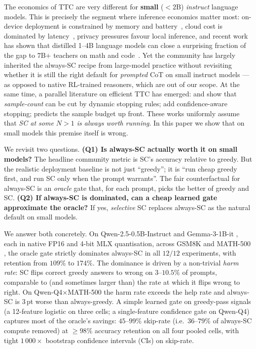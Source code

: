 \documentclass[11pt]{article}
\begin{document}
The economics of TTC are very different for \textbf{small} ($<2$B)
\emph{instruct} language models. This is precisely the segment
where inference economics matter most: on-device deployment is
constrained by memory and battery~\citep{Wang2025MNNLLM,
Bsharat2025MobileMMLU}, cloud cost is dominated by
latency~\citep{Cao2026PER}, privacy pressures favour local
inference, and recent work has shown that distilled
1--4B language models can close a surprising fraction of the gap to
$7$B$+$ teachers on math and code~\citep{Xu2025Phi4Mini,
DeepSeekR1,Zhu2024EoTD,Wang2025EffCoT}. Yet the community has
largely inherited the always-SC recipe from large-model practice
without revisiting whether it is still the right default for
\emph{prompted} CoT on small instruct models --- as opposed to
native RL-trained reasoners, which are out of our scope. At the same time, a parallel literature on efficient TTC has
emerged: \citet{Aggarwal2023AdaptiveConsistency} and
\citet{Wan2024RASC} show that \emph{sample-count} can be cut by
dynamic stopping rules; \citet{Aghazadeh2025CGES, Kim2026ReASC}
add confidence-aware stopping; \citet{Ji2025SeerSC} predicts the
sample budget up front. These works uniformly assume that \emph{SC
at some $N{>}1$ is always worth running}. In this paper we show that
on small models this premise itself is wrong.

We revisit two questions. \textbf{(Q1) Is always-SC actually worth it
on small models?} The headline community metric is SC's accuracy
relative to greedy. But the realistic deployment baseline is not just
``greedy''; it is ``run cheap greedy first, and run SC only when the
prompt warrants''. The fair counterfactual for always-SC is an
\emph{oracle} gate that, for each prompt, picks the better of greedy
and SC. \textbf{(Q2) If always-SC is dominated, can a cheap learned
gate approximate the oracle?} If yes, \emph{selective} SC replaces
always-SC as the natural default on small models.

We answer both concretely. On Qwen-2.5-0.5B-Instruct
\citep{Qwen25Report} and Gemma-3-1B-it \citep{Gemma3Report}, each in
native FP16 and 4-bit MLX quantisation, across GSM8K
\citep{Cobbe2021Verifiers} and MATH-500 \citep{Hendrycks2021MATH}, the
oracle gate strictly dominates always-SC in all $12/12$ experiments,
with retention from $109\%$ to $174\%$. The dominance is driven by a
non-trivial \emph{harm rate}: SC flips correct greedy answers to
wrong on $3$--$10.5\%$ of prompts, comparable to (and sometimes larger
than) the rate at which it flips wrong to right. On
Qwen-Q4${\times}$MATH-500 the harm rate exceeds the help rate and
always-SC is $3$\,pt worse than always-greedy. A simple learned gate
on greedy-pass signals (a 12-feature logistic on three cells; a
single-feature confidence gate on Qwen-Q4) captures most of the
oracle's savings: $45$--$99\%$ skip-rate (i.e.\ $36$--$79\%$ of
always-SC compute removed) at $\ge 98\%$ accuracy retention on all
four pooled cells, with tight $1\,000{\times}$ bootstrap
confidence intervals (CIs) on skip-rate.
\end{document}
